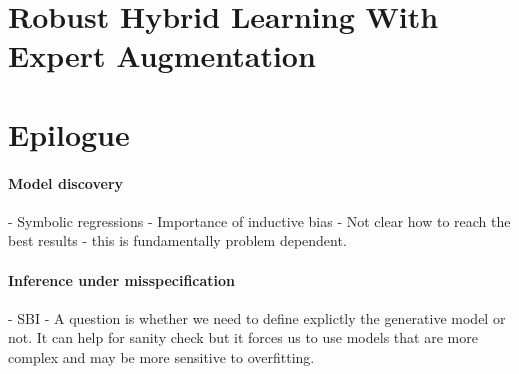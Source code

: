 %
%

\section{Robust Hybrid Learning With Expert Augmentation}


\section{Epilogue}

\paragraph{Model discovery}
- Symbolic regressions
- Importance of inductive bias
- Not clear how to reach the best results - this is fundamentally problem dependent.
\paragraph{Inference under misspecification}
 - SBI
 - A question is whether we need to define explictly the generative model or not. It can help for sanity check but it forces us to use models that are more complex and may be more sensitive to overfitting.
